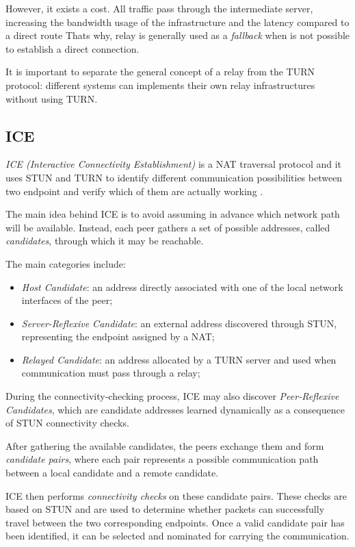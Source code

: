 However, it exists a cost. All traffic pass through the intermediate server, increasing the bandwidth usage of the infrastructure and the latency compared to a direct route
Thats why, relay is generally used as a \textit{fallback} when is not possible to establish a direct connection.

It is important to separate the general concept of a relay from the TURN protocol: different systems can implements their own relay infrastructures without using TURN.

\subsection{ICE}
\begin{definition}
	\textit{ICE (Interactive Connectivity Establishment)} is a NAT traversal protocol and it uses STUN and TURN to identify different communication possibilities between two endpoint
	and verify which of them are actually working \cite{rfc8445}.
\end{definition}

The main idea behind ICE is to avoid assuming in advance which network path will be available. Instead, each peer gathers a set of possible addresses, called \textit{candidates},
through which it may be reachable.

The main categories include:
\begin{itemize}
	\item \textit{Host Candidate}: an address directly associated with one of the local network interfaces of the peer;
	\item \textit{Server-Reflexive Candidate}: an external address discovered through STUN, representing the endpoint assigned by a NAT;
	\item \textit{Relayed Candidate}: an address allocated by a TURN server and used when communication must pass through a relay;
\end{itemize}

During the connectivity-checking process, ICE may also discover \textit{Peer-Reflexive Candidates}, which are candidate addresses learned dynamically as a consequence of STUN connectivity checks.

After gathering the available candidates, the peers exchange them and form \textit{candidate pairs}, where each pair represents a possible communication path between a local candidate and a remote candidate.

ICE then performs \textit{connectivity checks} on these candidate pairs. These checks are based on STUN and are used to determine whether packets can successfully travel between the two corresponding endpoints. Once a valid candidate pair has been identified, it can be selected and nominated for carrying the communication.

